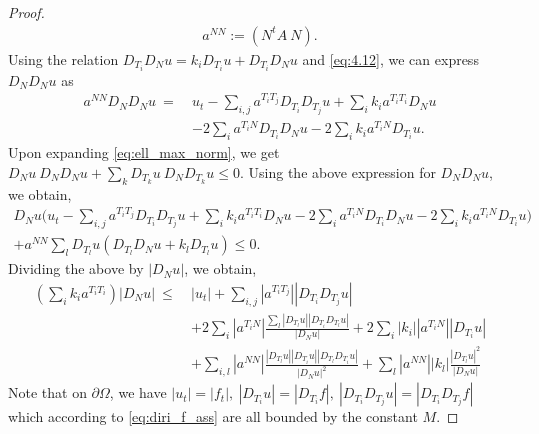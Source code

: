 \documentclass[12pt]{article}
\numberwithin{equation}{section}
\theoremstyle{plain}
\theoremstyle{definition}
\theoremstyle{remark}
\begin{document}
\begin{proof}
\begin{equation}
\begin{split}
a^{NN}   := \left( N^t A \ N \right).
\end{split}
\end{equation}
Using the relation $D_{T_i} D_N u = k_i D_{T_i} u + D_{T_i} D_N u$ and \eqref{eq:4.12}, we can express $D_ND_Nu$ as
\begin{equation}
\begin{split}
    a^{NN} D_N D_N u\ =\ & u_t - \sum_{i,j} a^{T_i T_j} D_{T_i} D_{T_j} u + \sum_i k_i a^{T_i T_i} D_N u \\ 
    & - 2 \sum_i a^{T_i N} D_{T_i} D_N u - 2 \sum_i k_i a^{T_i N} D_{T_i} u.
\end{split}
\end{equation}
Upon expanding \eqref{eq:ell_max_norm}, we get $D_N u \ D_N D_N u + \sum_k D_{T_k} u \ D_N D_{T_k} u \leq 0$. Using the above expression for $D_ND_Nu$, we obtain,
\begin{multline*}
D_N u \Big( u_t - \sum_{i,j} a^{T_i T_j} D_{T_i} D_{T_j} u + \sum_i k_i a^{T_i T_i} D_N u  - 2 \sum_i a^{T_i N} D_{T_i} D_N u
    - 2 \sum_i k_i a^{T_i N} D_{T_i} u \Big)\\
    + a^{NN} \sum_l D_{T_l} u (D_{T_l} D_N u + k_l D_{T_l} u) \leq 0. 
\end{multline*}
Dividing the above by $|D_N u|$, we obtain,
\begin{equation} \label{eq:diri_ineq1}
\begin{split}
    \left(\sum_i k_i a^{T_i T_i}\right) |D_N u|\  \leq \ &|u_t| + \sum_{i,j} |a^{T_i T_j}| |D_{T_i} D_{T_j} u| \\ 
    & + 2 \sum_i |a^{T_i N}| \frac{\sum_l |D_{T_l} u| |D_{T_i} D_{T_l} u|}{|D_N u|} + 2 \sum_i |k_i| |a^{T_i N}| |D_{T_i} u| \\
    & + \sum_{i,l} |a^{NN}| \frac{|D_{T_l} u| |D_{T_i} u| |D_{T_l} D_{T_i} u|}{|D_N u|^2} + \sum_l |a^{NN}| |k_l| \frac{|D_{T_l} u|^2}{|D_N u|}
\end{split}
\end{equation}
Note that on $\partial \Omega$, we have
$|u_t|=|f_t|, \ |D_{T_i} u|=|D_{T_i} f|, \ |D_{T_i} D_{T_j} u|=|D_{T_i} D_{T_j} f|$
which according to \eqref{eq:diri_f_ass} are all bounded by the constant $M$.  


\end{proof}
\end{document}
